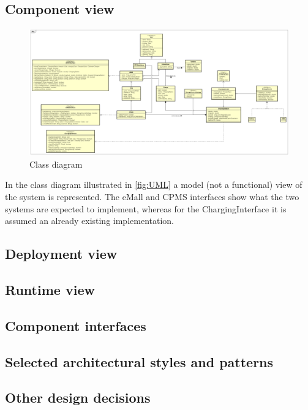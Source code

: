 \subsection{Component view}
\begin{figure}[!h]
    \begin{center}
        \includegraphics[keepaspectratio, width=16cm]{UML.png}
        \caption{Class diagram}
        \label{fig:UML}
    \end{center}
\end{figure}
In the class diagram illustrated in \autoref{fig:UML} a model (not a functional) view of the system is represented. The \ac{eMall} and \ac{CPMS} interfaces show what the two systems are expected to implement, whereas for the ChargingInterface it is assumed an already existing implementation.
\subsection{Deployment view}
\subsection{Runtime view}
\subsection{Component interfaces}
\subsection{Selected architectural styles and patterns}
\subsection{Other design decisions}
\clearpage